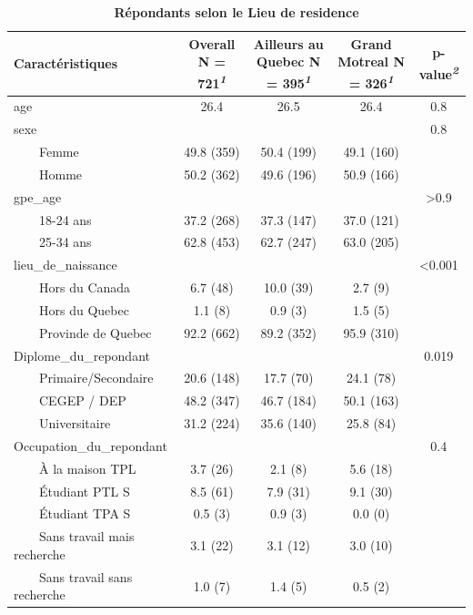 \documentclass[
]{article}
\begin{document}
\newpage
\begin{table}[!t]
\caption{\label{tab:unnamed-chunk-7}\textbf{Répondants selon le Lieu de residence}} 
\fontsize{12.0pt}{14.4pt}\selectfont
\begin{tabular*}{\linewidth}{@{\extracolsep{\fill}}lcccc}
\toprule
\textbf{Caractéristiques} & \textbf{Overall}  N = 721\textsuperscript{\textit{1}} & \textbf{Ailleurs au Quebec}  N = 395\textsuperscript{\textit{1}} & \textbf{Grand Motreal}  N = 326\textsuperscript{\textit{1}} & \textbf{p-value}\textsuperscript{\textit{2}} \\ 
\midrule\addlinespace[2.5pt]
age & 26.4 & 26.5 & 26.4 & 0.8 \\ 
sexe &  &  &  & 0.8 \\ 
    Femme & 49.8   (359) & 50.4   (199) & 49.1   (160) &  \\ 
    Homme & 50.2   (362) & 49.6   (196) & 50.9   (166) &  \\ 
gpe\_age &  &  &  & >0.9 \\ 
    18-24 ans & 37.2   (268) & 37.3   (147) & 37.0   (121) &  \\ 
    25-34 ans & 62.8   (453) & 62.7   (247) & 63.0   (205) &  \\ 
lieu\_de\_naissance &  &  &  & <0.001 \\ 
    Hors du Canada & 6.7   (48) & 10.0   (39) & 2.7   (9) &  \\ 
    Hors du Quebec & 1.1   (8) & 0.9   (3) & 1.5   (5) &  \\ 
    Provinde de Quebec & 92.2   (662) & 89.2   (352) & 95.9   (310) &  \\ 
Diplome\_du\_repondant &  &  &  & 0.019 \\ 
    Primaire/Secondaire & 20.6   (148) & 17.7   (70) & 24.1   (78) &  \\ 
    CEGEP / DEP & 48.2   (347) & 46.7   (184) & 50.1   (163) &  \\ 
    Universitaire & 31.2   (224) & 35.6   (140) & 25.8   (84) &  \\ 
Occupation\_du\_repondant &  &  &  & 0.4 \\ 
    À la maison TPL & 3.7   (26) & 2.1   (8) & 5.6   (18) &  \\ 
    Étudiant PTL S & 8.5   (61) & 7.9   (31) & 9.1   (30) &  \\ 
    Étudiant TPA S & 0.5   (3) & 0.9   (3) & 0.0   (0) &  \\ 
    Sans travail mais recherche & 3.1   (22) & 3.1   (12) & 3.0   (10) &  \\ 
    Sans travail sans recherche & 1.0   (7) & 1.4   (5) & 0.5   (2) &  \\ 

\end{tabular*}
\end{table}
\end{document}

